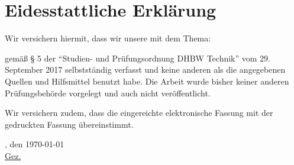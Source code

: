 
\chapter*{Eidesstattliche Erklärung}
Wir versichern hiermit, dass wir unsere \arbeit{} mit dem Thema:
\begin{quote}
	\textit{\thetitle}
\end{quote}
gemäß § 5 der \enquote{Studien- und Prüfungsordnung DHBW Technik} vom 29. September 2017 selbstständig verfasst und keine anderen als die angegebenen Quellen und Hilfsmittel benutzt habe. Die Arbeit wurde bisher keiner anderen Prüfungsbehörde vorgelegt und auch nicht veröffentlicht.

\vspace{0.25cm}

Wir versichern zudem, dass die eingereichte elektronische Fassung mit der gedruckten Fassung übereinstimmt.

\vspace{1cm}

\verfassungsort, den \today \\[0.5cm]
	{\underline{Gez. \theauthor}}
	{\makebox[10cm]{\hrulefill}}\\
\theauthor
